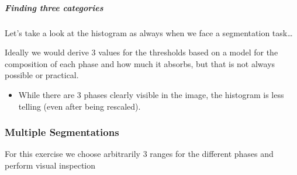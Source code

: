 \documentclass[letterpaper,10pt,english]{sphinxmanual}
\begin{document}
\noindent{}


\subparagraph{Finding three categories}
\label{\detokenize{04-BasicSegmentation_Part2:finding-three-categories}}
\sphinxAtStartPar
Let’s take a look at the histogram as always when we face a segmentation task…

\sphinxAtStartPar
Ideally we would derive 3 values for the thresholds based on a model for the composition of each phase and how much it absorbs, but that is not always possible or practical.
\begin{itemize}
\item {} 
\sphinxAtStartPar
While there are 3 phases clearly visible in the image, the histogram is less telling (even after being re\sphinxhyphen{}scaled).

\end{itemize}

\begin{sphinxVerbatim}[commandchars=\\\{\}]
  
\PYG{p}{[}\PYG{p}{]}  \PYG{p}{[}\PYG{p}{]}
\PYG{p}{[}\PYG{p}{]}  \PYG{p}{[}\PYG{p}{]}
\end{sphinxVerbatim}

\noindent{}


\subsubsection{Multiple Segmentations}
\label{\detokenize{04-BasicSegmentation_Part2:multiple-segmentations}}
\sphinxAtStartPar
For this exercise we choose arbitrarily 3 ranges for the different phases and perform visual inspection
\end{document}
